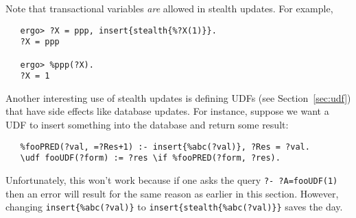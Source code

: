 Note that transactional variables \emph{are} allowed in stealth updates. For example,
\begin{verbatim}
   ergo> ?X = ppp, insert{stealth{%?X(1)}}.
   ?X = ppp

   ergo> %ppp(?X).
   ?X = 1
\end{verbatim}

Another interesting use of stealth updates is defining UDFs (see
Section~\ref{sec:udf}) that have side
effects like database updates. For instance, suppose we want a UDF to
insert something into the database and return some result:
\begin{verbatim}
   %fooPRED(?val, =?Res+1) :- insert{%abc(?val)}, ?Res = ?val.
   \udf fooUDF(?form) := ?res \if %fooPRED(?form, ?res).
\end{verbatim}
Unfortunately, this won't work because if one asks the query \texttt{?-
?A=fooUDF(1)} then an error will result for the same reason as earlier in
this section. However, changing \texttt{insert\{\%abc(?val)\}}  to
\texttt{insert\{stealth\{\%abc(?val)\}\}} saves the day. 



